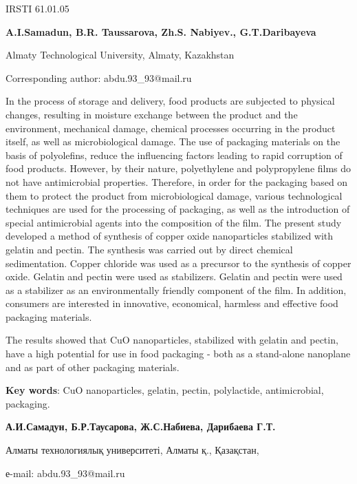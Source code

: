 \newpage
IRSTI 61.01.05


\begin{center}
{\bfseries A.I.Samadun, B.R. Taussarova, Zh.S. Nabiyev., G.T.Daribayeva}

Almaty Technological University, Almaty, Kazakhstan

Corresponding author: abdu.93\_93@mail.ru
\end{center}

In the process of storage and delivery, food products are subjected to
physical changes, resulting in moisture exchange between the product and
the environment, mechanical damage, chemical processes occurring in the
product itself, as well as microbiological damage. The use of packaging
materials on the basis of polyolefins, reduce the influencing factors
leading to rapid corruption of food products. However, by their nature,
polyethylene and polypropylene films do not have antimicrobial
properties. Therefore, in order for the packaging based on them to
protect the product from microbiological damage, various technological
techniques are used for the processing of packaging, as well as the
introduction of special antimicrobial agents into the composition of the
film. The present study developed a method of synthesis of copper oxide
nanoparticles stabilized with gelatin and pectin. The synthesis was
carried out by direct chemical sedimentation. Copper chloride was used
as a precursor to the synthesis of copper oxide. Gelatin and pectin were
used as stabilizers. Gelatin and pectin were used as a stabilizer as an
environmentally friendly component of the film. In addition, consumers
are interested in innovative, economical, harmless and effective food
packaging materials.

The results showed that CuO nanoparticles, stabilized with gelatin and
pectin, have a high potential for use in food packaging - both as a
stand-alone nanoplane and as part of other packaging materials.

{\bfseries Key words}: CuO nanoparticles, gelatin, pectin, polylactide,
antimicrobial, packaging.


\begin{center}
{\bfseries А.И.Самадун, Б.Р.Таусарова, Ж.С.Набиева, Дарибаева Г.Т.}

Алматы технологиялық университеті, Алматы қ., Қазақстан,

е-mail: abdu.93\_93@mail.ru
\end{center}

